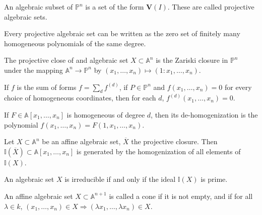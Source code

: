 \documentclass[crop=false,class=article,oneside]{standalone}
\begin{document}
            \begin{definition}
                An algebraic subset of $\mathbb{P}^{n}$ is a
                set of the form $\mathbf{V}(I)$.
                These are called projective algebraic sets.
            \end{definition}
            \begin{theorem}
                Every projective algebraic set can be
                written as the zero set of finitely many
                homogeneous polynomials of the same degree.
            \end{theorem}
            \begin{definition}
                The projective close of and algebraic set
                $X\subset\mathbb{A}^n$ is the Zariski closure
                in $\mathbb{P}^{n}$ under the mapping
                $\mathbb{A}^{n}\rightarrow\mathbb{P}^n$
                by $(x_{1},\hdots,x_{n})\mapsto(1:x_1,\hdots, x_n)$.
            \end{definition}
            \begin{theorem}
                If $f$ is the sum of forms $f=\sum_{d}f^{(d)}$,
                if $P\in \mathbb{P}^n$ and $f(x_1,\hdots, x_n)=0$
                for every choice of homogeneous coordinates,
                then for each $d$, $f^{(d)}(x_1,\hdots, x_n)=0$.
            \end{theorem}
            \begin{definition}
                If $F\in \mathbb{A}[x_1,\hdots, x_n]$ is homogeneous
                of degree $d$, then its de-homogenization is the
                polynomial $f(x_1,\hdots, x_n)=F(1,x_1,\hdots, x_n)$.
            \end{definition}
            \begin{theorem}
                Let $X\subset \mathbb{A}^n$ be an affine
                algebraic set, $\overline{X}$ the projective closure. Then
                $\mathbb{I}(\overline{X})\subset\mathbb{A}[x_1,\hdots,x_n]$
                is generated by the homogenization of all
                elements of $\mathbb{I}(X)$.
            \end{theorem}
            \begin{theorem}
                An algebraic set $X$ is irreducible
                if and only if the ideal $\mathbb{I}(X)$ is prime.
            \end{theorem}
            \begin{definition}
                An affine algebraic set $X\subset \mathbb{A}^{n+1}$
                is called a cone if it is not empty, and if for all
                $\lambda\in{k}$,
                $(x_1,\hdots, x_n)%
                 \in{X}\Rightarrow(\lambda{x_{1}},\hdots,\lambda{x_{n}})%
                 \in{X}$.
            \end{definition}
\end{document}
